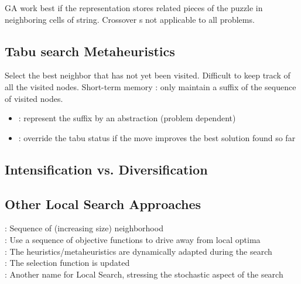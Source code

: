 GA work best if the representation stores related pieces of the puzzle in neighboring cells of string. Crossover s not applicable to all problems.

\subsection{Tabu search Metaheuristics}
Select the best neighbor that has not yet been visited. Difficult to keep track of all the visited nodes. Short-term memory : only maintain a suffix of the sequence of visited nodes.
\begin{itemize}
\item {} : represent the suffix by an abstraction (problem dependent)
\item {} : override the tabu status if the move improves the best solution found so far
\end{itemize}

\subsection{Intensification vs. Diversification}

\begin{Parallel}[v]{0.48\textwidth}{0.48\textwidth}
\ParallelPar
\end{Parallel}

\subsection{Other Local Search Approaches}

 : Sequence of (increasing size) neighborhood\\
 : Use a sequence of objective functions to drive away from local optima\\
 : The heuristics/metaheuristics are dynamically adapted during the search\\
 : The selection function is updated\\
 : Another name for Local Search, stressing the stochastic aspect of the search

